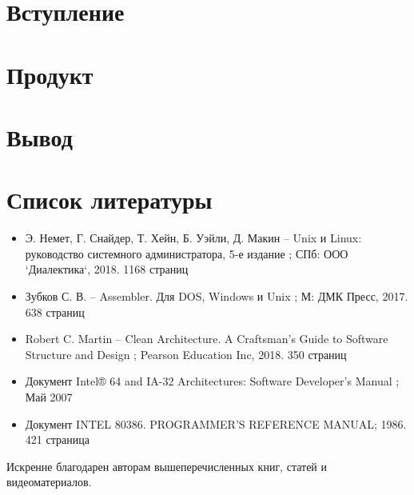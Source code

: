 \documentclass[a4paper]{article}
\begin{document}
\section{Вступление}
\section{Продукт}
\section{Вывод}
\section{Список литературы}
	\begin{itemize}
		\item Э. Немет, Г. Снайдер, Т. Хейн, Б. Уэйли, Д. Макин --
			\flqq{}Unix и Linux: руководство системного
			администратора, 5-е издание \frqq{}; СПб: ООО
			`Диалектика`, 2018. 1168 страниц
		\item Зубков С. В. -- \flqq{}Assembler. Для DOS, Windows и
			Unix \frqq{}; М: ДМК Пресс, 2017. 638 страниц
		\item Robert C. Martin -- \flqq{}Clean Architecture. A Craftsman's
			Guide to Software Structure and Design \frqq{}; Pearson
			Education Inc, 2018. 350 страниц
		\item Документ \flqq{}Intel® 64 and IA-32 Architectures:
			Software Developer’s Manual \frqq{}; Май 2007
		\item Документ \flqq{} INTEL 80386. PROGRAMMER'S REFERENCE
			MANUAL\frqq{}; 1986. 421 страница
	\end{itemize}
	Искренне благодарен авторам вышеперечисленных книг, статей и
	видеоматериалов.
\end{document}
